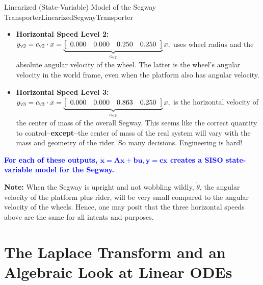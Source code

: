 \begin{factColor}{Linearized (State-Variable) Model of the Segway Transporter}{LinearizedSegwayTransporter}
\begin{itemize}
\begin{itemize}
\item  \textbf{Horizontal Speed Level 2:} $y_{\rm v2}=c_{\rm v2} \cdot x = 
 \underbrace{\left[
\begin{array}{cccc}
0.000 & 0.000 & 0.250 & 0.250 \\
\end{array}
\right]}_{c_{\rm v2}} x,$
uses wheel radius and the absolute angular velocity of the wheel. The latter is the wheel's angular velocity in the world frame, even when the platform also has angular velocity.

\item  \textbf{Horizontal Speed Level 3:} $y_{\rm v3}=c_{\rm v3} \cdot x = 
 \underbrace{\left[
\begin{array}{cccc}
0.000& 0.000 & 0.863 & 0.250 
\end{array}
\right]}_{c_{\rm v3}} x,$
is the horizontal velocity of the center of mass of the overall Segway. This seems like the correct quantity to control\textbf{--except--}the center of mass of the real system will vary with the mass and geometry of the rider. So many decisions. Engineering is hard! 

\end{itemize}

\end{itemize}

\vspace*{.2cm}

\textcolor{blue}{\bf For each of these outputs, $\bm{\dot{x} = Ax + b u, y = cx}$ creates a SISO state-variable model for the Segway.} 

\vspace*{.2cm} \textbf{Note:} When the Segway is upright and not wobbling wildly, $\dot{\theta}$, the angular velocity of the platform plus rider, will be very small compared to the angular velocity of the wheels. Hence, one may posit that the three horizontal speeds above are the same for all intents and purposes.
     
 \end{factColor}
 
\vspace*{.2cm}

\section{The Laplace Transform and an Algebraic Look at Linear ODEs}

